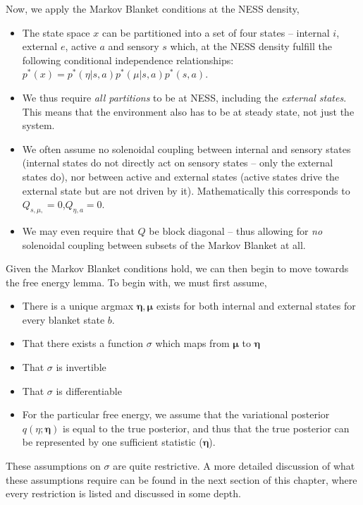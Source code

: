 Now, we apply the Markov Blanket conditions at the NESS density,
\begin{itemize}
  \item The state space $x$ can be partitioned into a set of four states -- internal $i$, external $e$, active $a$ and sensory $s$ which, at the NESS density fulfill the following conditional independence relationships:
  $p^*(x) = p^*(\eta | s,a)p^*(\mu | s,a)p^*(s,a)$.
  \item We thus require \emph{all partitions} to be at NESS, including the \emph{external states}. This means that the environment also has to be at steady state, not just the system.
  \item We often assume no solenoidal coupling between internal and sensory states (internal states do not directly act on sensory states -- only the external states do), nor between active and external states (active states drive the external state but are not driven by it). Mathematically this corresponds to $Q_{s, \mu,} = 0$,$Q_{\eta,a} = 0$. 
  \item We may even require that $Q$ be block diagonal -- thus allowing for \emph{no} solenoidal coupling between subsets of the Markov Blanket at all.
\end{itemize}
Given the Markov Blanket conditions hold, we can then begin to move towards the free energy lemma. To begin with, we must first assume,
\begin{itemize}
  \item There is a unique argmax $\bm{\eta}, \bm{\mu}$ exists for both internal and external states for every blanket state $b$.
  \item That there exists a function $\sigma$ which maps from $\bm{\mu}$ to $\bm{\eta}$
  \item That $\sigma$ is invertible
  \item That $\sigma$ is differentiable  
  \item For the particular free energy, we assume that the variational posterior $q(\eta ; \mathbf{\eta})$ is equal to the true posterior, and thus that the true posterior can be represented by one sufficient statistic ($\bm{\eta}$).
\end{itemize}
These assumptions on $\sigma$ are quite restrictive. A more detailed discussion of what these assumptions require can be found in the next section of this chapter, where every restriction is listed and discussed in some depth.

